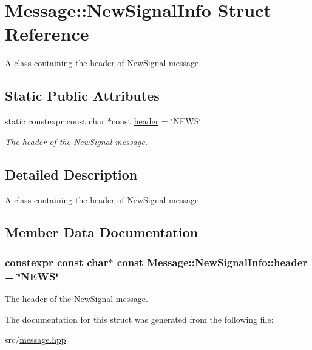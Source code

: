 \hypertarget{struct_message_1_1_new_signal_info}{\section{Message\-:\-:New\-Signal\-Info Struct Reference}
\label{struct_message_1_1_new_signal_info}
}


A class containing the header of New\-Signal message.  


\subsection*{Static Public Attributes}
\begin{DoxyCompactItemize}
\item 
static constexpr const char $\ast$const \hyperlink{struct_message_1_1_new_signal_info_a5740f71d3d50d4bec68c80a5edebad25}{header} = \char`\"{}N\-E\-W\-S\char`\"{}
\begin{DoxyCompactList}\small\item\em The header of the New\-Signal message. \end{DoxyCompactList}\end{DoxyCompactItemize}


\subsection{Detailed Description}
A class containing the header of New\-Signal message. 

\subsection{Member Data Documentation}
\hypertarget{struct_message_1_1_new_signal_info_a5740f71d3d50d4bec68c80a5edebad25}{
\subsubsection[{header}]{\setlength{\rightskip}{0pt plus 5cm}constexpr const char$\ast$ const Message\-::\-New\-Signal\-Info\-::header = \char`\"{}N\-E\-W\-S\char`\"{}\hspace{0.3cm}{\ttfamily [static]}}}\label{struct_message_1_1_new_signal_info_a5740f71d3d50d4bec68c80a5edebad25}


The header of the New\-Signal message. 



The documentation for this struct was generated from the following file\-:\begin{DoxyCompactItemize}
\item 
src/\hyperlink{message_8hpp}{message.\-hpp}\end{DoxyCompactItemize}
